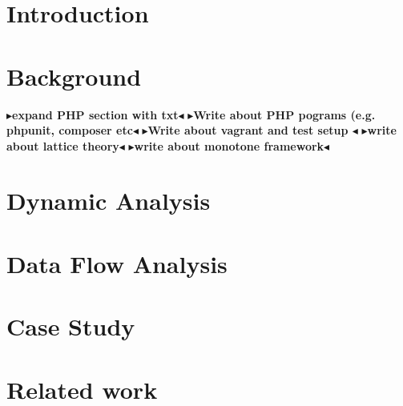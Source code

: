 \documentclass[twoside,11pt,openright]{report}
\theoremstyle{definition}
\newcommand{\todo}[1]{{\color[rgb]{.5,0,0}\textbf{$\blacktriangleright$#1$\blacktriangleleft$}}}
\begin{document}
\chapter{Introduction}
\label{ch:intro}


\chapter{Background}
\label{ch:background}

\todo{expand PHP section with txt}
\todo{Write about PHP pograms (e.g. phpunit, composer etc}
\todo{Write about vagrant and test setup }
\todo{write about lattice theory}
\todo{write about monotone framework}

\chapter{Dynamic Analysis}
\label{ch:study}



\chapter{Data Flow Analysis}
\label{ch:analysis}
%










\chapter{Case Study}
\label{ch:evaluation}

\chapter{Related work}
\label{ch:relatedWork}

\end{document}
